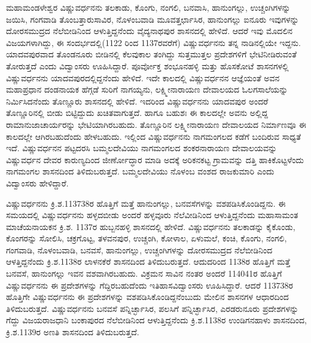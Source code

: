 ಮಹಾಮಂಡಳೇಶ್ವರ ವಿಷ್ಣುವರ್ಧನನು ತಲಕಾಡು, ಕೊಂಗು, ನಂಗಲಿ, ಬನವಾಸಿ, ಹಾನುಂಗಲ್ಲು, ಉಚ್ಚಂಗಿಗಳನ್ನು ಜಯಿಸಿ, ಗಂಗವಾಡಿ ತೊಂಬತ್ತಾರುಸಾವಿರ, ನೊಳಂಬವಾಡಿ ಮೂವತ್ತರ್ಛಾಸಿರ, ಹಾನುಂಗಲ್ಲು ಐನೂರು ಇವುಗಳನ್ನು ದೋರಸಮುದ್ರದ ನೆಲೆಬೀಡಿನಿಂದ ಆಳುತ್ತಿದ್ದನೆಂದು ವೈದ್ಯನಾಥಪುರ ಶಾಸನದಲ್ಲಿ ಹೇಳಿದೆ. ಆದರೆ ಇವು ಮೊದಲಿನ ವಿಜಯಗಳಾಗಿದ್ದು, ಈ ಸಂದರ್ಭದಲ್ಲಿ(1122 ರಿಂದ 1137ರವರೆಗೆ) ವಿಷ್ಣುವರ್ಧನನು ತನ್ನ ನಾಡಿನಲ್ಲಿಯೇ ಇದ್ದನು. ಯಾದವಪುರವಾದ ತೊಂಡನೂರು ಬೀಡಿನಲ್ಲಿ ಕೆಲವುಕಾಲ ತಂಗಿದ್ದು ಸುತ್ತಮುತ್ತಲ ಪ್ರದೇಶಗಳಿಗೆ ಭೇಟಿನೀಡಿರುವಂತೆ ತೋರುತ್ತದೆ ಎಂದು ವಿದ್ವಾಂಸರು ಊಹಿಸಿದ್ದಾರೆ. ಪೂರ್ವೋಕ್ತ ಶಂಭೂನಹಳ್ಳಿ ಮತ್ತು ಹೊಸಕೋಟೆ ಶಾಸನಗಳಲ್ಲಿ ವಿಷ್ಣುವರ್ಧನನು ಯಾದವಪುರದಲ್ಲಿದ್ದನೆಂದು ಹೇಳಿದೆ. ಇದೇ ಕಾಲದಲ್ಲಿ ವಿಷ್ಣುವರ್ಧನನ ಆಜ್ಞೆಯಂತೆ ಅವನ ಮಹಾಪ್ರಧಾನ ದಂಡನಾಯಕ ಹೆಗ್ಗಡೆ ಸುರಿಗೆ ನಾಗಯ್ಯನು, ಲಕ್ಷ್ಮೀನಾರಾಯಣ ದೇವಾಲಯದ ಓಲಗಸಾಲೆಯನ್ನು ನಿರ್ಮಿಸಿದನೆಂದು ತೊಣ್ಣೂರು ಶಾಸನದಲ್ಲಿ ಹೇಳಿದೆ. ಇದರಿಂದ ವಿಷ್ಣುವರ್ಧನನು ಯಾದವಪುರ ಅಂದರೆ ತೊಣ್ಣೂರಿನಲ್ಲಿ ಬೀಡು ಬಿಟ್ಟಿದ್ದುದು ಖಚಿತವಾಗುತ್ತದೆ. ಹಾಗೂ ಬಹುಶಃ ಈ ಕಾಲದಲ್ಲೇ ಅವನು ಅಲ್ಲಿದ್ದ ರಾಮಾನುಜಾಚಾರ್ಯರನ್ನು ಭೇಟಿಯಾಗಿರಬಹುದು. ತೊಣ್ಣೂರಿನ ಲಕ್ಷ್ಮೀನಾರಾಯಣ ದೇವಾಲಯದ ನಿರ್ಮಾಣವೂ ಈ ಕಾಲದಲ್ಲೇ ಆಗಿರಬಹುದೆಂದು ಹೇಳಬಹುದು. ಇಲ್ಲಿಂದ ವಿಷ್ಣುವರ್ಧನನು ನಾಗಮಂಗಲದ ಕಡೆಗೆ ಬಂದಿರುವ ಸಾಧ್ಯತೆ ಇದೆ. ವಿಷ್ಣುವರ್ಧನನ ಪಟ್ಟದರಸಿ ಬಮ್ಮಲದೇವಿಯು ನಾಗಮಂಗಲದ ಶಂಕರನಾರಾಯಣ ದೇವಾಲಯವನ್ನು ವಿಷ್ಣುವರ್ಧನ ದೇವರ ಕಾರುಣ್ಯದಿಂದ ಜೀರ್ಣೋದ್ಧಾರ ಮಾಡಿ ಅದಕ್ಕೆ ಅರಿಕನಕಟ್ಟ ಗ್ರಾಮವನ್ನು ದತ್ತಿ ಹಾಕಿಕೊಟ್ಟಳೆಂದು ನಾಗಮಂಗಲ ಶಾಸನದಿಂದ ತಿಳಿದುಬರುತ್ತದೆ. ಬಮ್ಮಲದೇವಿಯು ನೊಳಂಬ ವಂಶದ ರಾಜಕುಮಾರಿ ಎಂದು ವಿದ್ವಾಂಸರು ಹೇಳಿದ್ದಾರೆ.

ವಿಷ್ಣುವರ್ಧನನು ಕ್ರಿ.ಶ.113738ರ ಹೊತ್ತಿಗೆ ಮತ್ತೆ ಹಾನುಂಗಲ್ಲು, ಬನವಸೆಗಳನ್ನು ವಶಪಡಿಸಿಕೊಂಡಿದ್ದನು. ಈ ಸಮಯ\-ದಲ್ಲಿ ವಿಷ್ಣುವರ್ಧನನು ಹಳ್ಳದಬೀಡು ಅಂದರೆ ಹಳ್ಳವೂರು ನೆಲೆವೀಡಿನಿಂದ ಆಳುತ್ತಿದ್ದನೆಂದು ಮಹಾಸಾಮಂತ ಮಾಚೆಯನಾಯಕನ ಕ್ರಿ.ಶ. 1137ರ ಹುಬ್ಬನಹಳ್ಳಿ ಶಾಸನದಲ್ಲಿ ಹೇಳಿದೆ. ವಿಷ್ಣುವರ್ಧನನು ತಲಕಾಡನ್ನು ಕೈಕೊಂಡು, ಕೊಂಗರನ್ನು ಸೋಲಿಸಿ, ಚಕ್ರಗೊಟ್ಟ, ತಳವನಪುರ, ಉಚ್ಚಂಗಿ, ಕೋಳಾಲ, ಏಳುಮಲೆ, ಕಂಚಿ, ಕೊಂಗು, ನಂಗಲಿ, ಗಂಗವಾಡಿ, ನೊಳಂಬವಾಡಿ, ಬನವಸೆ, ಹಾನುಂಗಲ್ಲು, ಉಚ್ಚಂಗಿಗಳನ್ನು ದೋರಸಮುದ್ರದ ನೆಲೆಬೀಡಿನಿಂದ ಆಳತ್ತಿದ್ದನೆಂದು ಕ್ರಿ.ಶ.1138ರ ಲಾಳನಕೆರೆ ಶಾಸನದಿಂದ ತಿಳಿದುಬರುತ್ತದೆ. ಆದುದರಿಂದ 1138ರ ಹೊತ್ತಿಗೆ ಮತ್ತೆ ಬನವಸೆ, ಹಾನುಂಗಲ್ಲು ಇವನ ವಶವಾಗಿರಬಹುದು. ವಿಕ್ರಮನ ಸಾವಿನ ನಂತರ ಅಂದರೆ 114041ರ ಹೊತ್ತಿಗೆ ವಿಷ್ಣುವರ್ಧನನು ಈ ಪ್ರದೇಶಗಳನ್ನು ಗೆದ್ದಿರಬಹುದೆಂದು ಇತಿಹಾಸವಿದ್ವಾಂಸರು ಊಹಿಸಿದ್ದಾರೆ. ಆದರೆ 113738ರ ಹೊತ್ತಿಗೇ ವಿಷ್ಣುವರ್ಧನನು ಈ ಪ್ರದೇಶಗಳನ್ನು ವಶಪಡಿಸಿಕೊಂಡಿದ್ದನೆಂಬುದು ಮೇಲಿನ ಶಾಸನಗಳ ಆಧಾರದಿಂದ ತಿಳಿದುಬರುತ್ತದೆ. ವಿಷ್ಣುವರ್ಧನನು ಬನವಸೆ ಪನ್ನಿರ್ಚ್ಛಾಸಿರ, ಪಲಸಿಗೆ ಪನ್ನಿರ್ಚ್ಛಾಸಿರ, ಎರಡರುನೂರು ಪ್ರದೇಶಗಳನ್ನು ಗೆದ್ದು ವಿಜಯರಾಜಧಾನಿ ಬಂಕಾಪುರದ ನೆಲೆಬೀಡಿನಿಂದ ಆಳುತ್ತಿದ್ದ\-ನೆಂದು ಕ್ರಿ.ಶ.1138ರ ಉಂಡಿಗನಹಾಳು ಶಾಸನದಿಂದ, ಕ್ರಿ.ಶ.1139ರ ಅಣತಿ ಶಾಸನದಿಂದ ತಿಳಿದುಬರುತ್ತದೆ.

